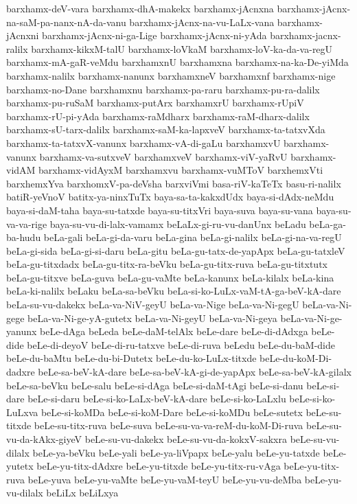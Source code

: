 {barxhamx-deV-vara
barxhamx-dhA-makekx
barxhamx-jAcnxna
barxhamx-jAcnx-na-saM-pa-nanx-nA-da-vanu
barxhamx-jAcnx-na-vu-LaLx-vana
barxhamx-jAcnxni
barxhamx-jAcnx-ni-ga-Lige
barxhamx-jAcnx-ni-yAda
barxhamx-jacnx-ralilx
barxhamx-kikxM-talU
barxhamx-loVkaM
barxhamx-loV-ka-da-va-regU
barxhamx-mA-gaR-veMdu
barxhamxnU
barxhamxna
barxhamx-na-ka-De-yiMda
barxhamx-nalilx
barxhamx-nanunx
barxhamxneV
barxhamxnf
barxhamx-nige
barxhamx-no-Dane
barxhamxnu
barxhamx-pa-raru
barxhamx-pu-ra-dalilx
barxhamx-pu-ruSaM
barxhamx-putArx
barxhamxrU
barxhamx-rUpiV
barxhamx-rU-pi-yAda
barxhamx-raMdharx
barxhamx-raM-dharx-dalilx
barxhamx-sU-tarx-dalilx
barxhamx-saM-ka-lapxveV
barxhamx-ta-tatxvXda
barxhamx-ta-tatxvX-vanunx
barxhamx-vA-di-gaLu
barxhamxvU
barxhamx-vanunx
barxhamx-va-sutxveV
barxhamxveV
barxhamx-viV-yaRvU
barxhamx-vidAM
barxhamx-vidAyxM
barxhamxvu
barxhamx-vuMToV
barxhemxVti
barxhemxYva
barxhomxV-pa-deVsha
barxviVmi
basa-riV-kaTeTx
basu-ri-nalilx
batiR-yeVnoV
batitx-ya-ninxTuTx
baya-sa-ta-kakxdUdx
baya-si-dAdx-neMdu
baya-si-daM-taha
baya-su-tatxde
baya-su-titxVri
baya-suva
baya-su-vana
baya-su-va-va-rige
baya-su-vu-di-lalx-vamamx
beLaLx-gi-ru-vu-danUnx
beLadu
beLa-ga-ba-hudu
beLa-gali
beLa-gi-da-varu
beLa-gina
beLa-gi-nalilx
beLa-gi-na-va-regU
beLa-gi-sida
beLa-gi-si-daru
beLa-gitu
beLa-gu-tatx-de-yapApx
beLa-gu-tatxleV
beLa-gu-titxdadx
beLa-gu-titx-ra-beVku
beLa-gu-titx-ruva
beLa-gu-titxtutx
beLa-gu-titxve
beLa-guva
beLa-gu-vaMte
beLa-kanunx
beLa-kilalx
beLa-kina
beLa-ki-nalilx
beLaku
beLa-sa-beVku
beLa-si-ko-LuLx-vaM-tA-ga-beV-kA-dare
beLa-su-vu-dakekx
beLa-va-NiV-geyU
beLa-va-Nige
beLa-va-Ni-gegU
beLa-va-Ni-gege
beLa-va-Ni-ge-yA-gutetx
beLa-va-Ni-geyU
beLa-va-Ni-geya
beLa-va-Ni-ge-yanunx
beLe-dAga
beLeda
beLe-daM-telAlx
beLe-dare
beLe-di-dAdxga
beLe-dide
beLe-di-deyoV
beLe-di-ru-tatxve
beLe-di-ruva
beLedu
beLe-du-baM-dide
beLe-du-baMtu
beLe-du-bi-Dutetx
beLe-du-ko-LuLx-titxde
beLe-du-koM-Di-dadxre
beLe-sa-beV-kA-dare
beLe-sa-beV-kA-gi-de-yapApx
beLe-sa-beV-kA-gilalx
beLe-sa-beVku
beLe-salu
beLe-si-dAga
beLe-si-daM-tAgi
beLe-si-danu
beLe-si-dare
beLe-si-daru
beLe-si-ko-LaLx-beV-kA-dare
beLe-si-ko-LaLxlu
beLe-si-ko-LuLxva
beLe-si-koMDa
beLe-si-koM-Dare
beLe-si-koMDu
beLe-sutetx
beLe-su-titxde
beLe-su-titx-ruva
beLe-suva
beLe-su-va-va-reM-du-koM-Di-ruva
beLe-su-vu-da-kAkx-giyeV
beLe-su-vu-dakekx
beLe-su-vu-da-kokxV-sakxra
beLe-su-vu-dilalx
beLe-ya-beVku
beLe-yali
beLe-ya-liVpapx
beLe-yalu
beLe-yu-tatxde
beLe-yutetx
beLe-yu-titx-dAdxre
beLe-yu-titxde
beLe-yu-titx-ru-vAga
beLe-yu-titx-ruva
beLe-yuva
beLe-yu-vaMte
beLe-yu-vaM-teyU
beLe-yu-vu-deMba
beLe-yu-vu-dilalx
beLiLx
beLiLxya
}

